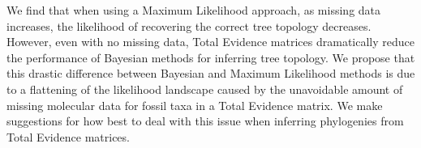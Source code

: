 \documentclass[12pt,letterpaper]{article}
\begin{document}
We find that when using a Maximum Likelihood approach, as missing data increases, the likelihood of recovering the correct tree topology decreases.
However, even with no missing data, Total Evidence matrices dramatically reduce the performance of Bayesian methods for inferring tree topology.
We propose that this drastic difference between Bayesian and Maximum Likelihood methods is due to a flattening of the likelihood landscape caused by the unavoidable amount of missing molecular data for fossil taxa in a Total Evidence matrix.
We make suggestions for how best to deal with this issue when inferring phylogenies from Total Evidence matrices.



%
%
\end{document}
